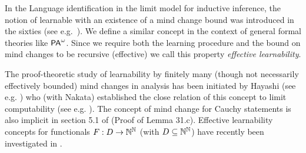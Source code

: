 In the Language identification in the limit model for inductive inference, the 
notion of learnable with an existence of a mind change bound was introduced in 
the sixties (see e.g.~\cite{Gold(67)}). We define a similar concept in the context of 
general formal theories like ${\textsf{\upshape PA}}^\omega$. Since we require both the learning 
procedure and the bound on mind changes to be recursive (effective) we call 
this property {\em effective learnability}. 
\begin{rmk}
The proof-theoretic study of 
learnability by finitely 
many (though not necessarily effectively bounded) mind changes in analysis 
has been initiated by Hayashi (see e.g. \cite{Hayashi02,Hayashi06}) 
who (with Nakata) 
established the close relation of this 
concept to limit computability (see e.g. 
\cite{Hayashi/Nakata}). The concept of mind change for Cauchy statements is 
also implicit in section 5.1 of \cite{Ziegler(07)} (Proof of Lemma 31.c). 
Effective learnability concepts for 
functionals $F:D\to\mathbb{N}^{\mathbb{N}}$ (with $D\subseteq\mathbb{N}^{\mathbb{N}}$) have recently 
been investigated in \cite{Higuchi/Kihara}.
\end{rmk}


